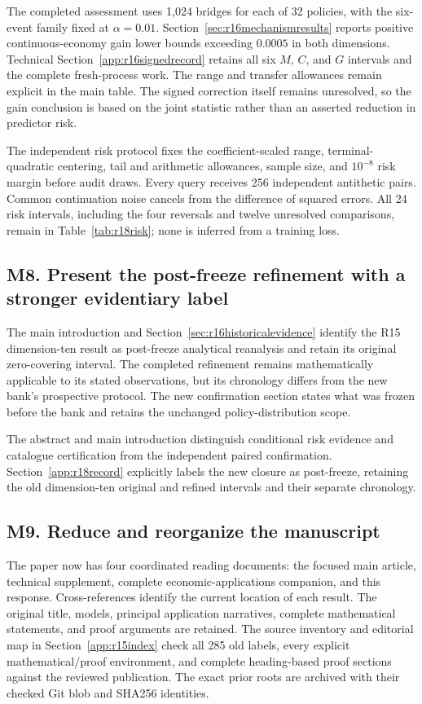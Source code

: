 The completed assessment uses 1,024 bridges for each of 32 policies, with the six-event family fixed at $\alpha=0.01$. Section~\ref{sec:r16mechanismresults} reports positive continuous-economy gain lower bounds exceeding $0.0005$ in both dimensions. Technical Section~\ref{app:r16signedrecord} retains all six $M$, $C$, and $G$ intervals and the complete fresh-process work. The range and transfer allowances remain explicit in the main table. The signed correction itself remains unresolved, so the gain conclusion is based on the joint statistic rather than an asserted reduction in predictor risk.


The independent risk protocol fixes the coefficient-scaled range, terminal-quadratic centering, tail and arithmetic allowances, sample size, and $10^{-8}$ risk margin before audit draws. Every query receives 256 independent antithetic pairs. Common continuation noise cancels from the difference of squared errors. All 24 risk intervals, including the four reversals and twelve unresolved comparisons, remain in Table~\ref{tab:r18risk}; none is inferred from a training loss.

\subsection*{M8. Present the post-freeze refinement with a stronger evidentiary label}\label{resp:M8}
The main introduction and Section~\ref{sec:r16historicalevidence} identify the R15 dimension-ten result as post-freeze analytical reanalysis and retain its original zero-covering interval. The completed refinement remains mathematically applicable to its stated observations, but its chronology differs from the new bank's prospective protocol. The new confirmation section states what was frozen before the bank and retains the unchanged policy-distribution scope.


The abstract and main introduction distinguish conditional risk evidence and catalogue certification from the independent paired confirmation. Section~\ref{app:r18record} explicitly labels the new closure as post-freeze, retaining the old dimension-ten original and refined intervals and their separate chronology.

\subsection*{M9. Reduce and reorganize the manuscript}\label{resp:M9}
The paper now has four coordinated reading documents: the focused main article, technical supplement, complete economic-applications companion, and this response. Cross-references identify the current location of each result. The original title, models, principal application narratives, complete mathematical statements, and proof arguments are retained. The source inventory and editorial map in Section~\ref{app:r15index} check all 285 old labels, every explicit mathematical/proof environment, and complete heading-based proof sections against the reviewed publication. The exact prior roots are archived with their checked Git blob and SHA256 identities.


